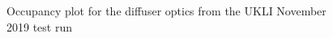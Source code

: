 \begin{figure}[!htbp]
    
\end{figure}

\begin{figure}[!htbp]
    \centering
    
    \caption{Occupancy plot for the diffuser optics from the UKLI November 2019 test run} \label{fig:occupancy_diffuser} 
    

\end{figure}
